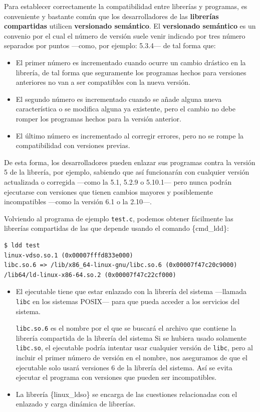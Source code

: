 Para establecer correctamente la compatibilidad entre librerías y
programas, es conveniente y bastante común que los desarrolladores de
las \textbf{librerías compartidas} utilicen \textbf{versionado
semántico}. El \textbf{{}versionado semántico} es un convenio por el
cual el número de versión suele venir indicado por tres número separados
por puntos ---como, por ejemplo: 5.3.4--- de tal forma que:

\begin{itemize}
\item
  El primer número es incrementado cuando ocurre un cambio drástico en
  la librería, de tal forma que seguramente los programas hechos para
  versiones anteriores no van a ser compatibles con la nueva versión.
\item
  El segundo número es incrementado cuando se añade alguna nueva
  característica o se modifica alguna ya existente, pero el cambio no
  debe romper los programas hechos para la versión anterior.
\item
  El último número es incrementado al corregir errores, pero no se rompe
  la compatibilidad con versiones previas.
\end{itemize}

De esta forma, los desarrolladores pueden enlazar sus programas contra
la versión 5 de la librería, por ejemplo, sabiendo que así funcionarán
con cualquier versión actualizada o corregida ---como la 5.1, 5.2.9 o
5.10.1--- pero nunca podrán ejecutarse con versiones que tienen cambios
mayores y posiblemente incompatibles ---como la versión 6.1 o la
2.10---.

Volviendo al programa de ejemplo \texttt{test.c}, podemos obtener
fácilmente las librerías compartidas de las que depende usando el
comando \{cmd\_ldd\}:

\begin{verbatim}
$ ldd test
linux-vdso.so.1 (0x00007fffd833e000)
libc.so.6 => /lib/x86_64-linux-gnu/libc.so.6 (0x00007f47c20c9000)   
/lib64/ld-linux-x86-64.so.2 (0x00007f47c22cf000)                    
\end{verbatim}

\begin{itemize}
\item
  El ejecutable tiene que estar enlazado con la librería del sistema
  ---llamada \texttt{libc} en los sistemas POSIX--- para que pueda
  acceder a los servicios del sistema.

  \texttt{libc.so.6} es el nombre por el que se buscará el archivo que
  contiene la librería compartida de la librería del sistema Si se
  hubiera usado solamente \texttt{libc.so}, el ejecutable podría
  intentar usar cualquier versión de \texttt{libc}, pero al incluir el
  primer número de versión en el nombre, nos aseguramos de que el
  ejecutable solo usará versiones 6 de la librería del sistema. Así se
  evita ejecutar el programa con versiones que pueden ser incompatibles.
\item
  La librería \{linux\_ldso\} se encarga de las cuestiones relacionadas
  con el enlazado y carga dinámica de librerías.
\end{itemize}

